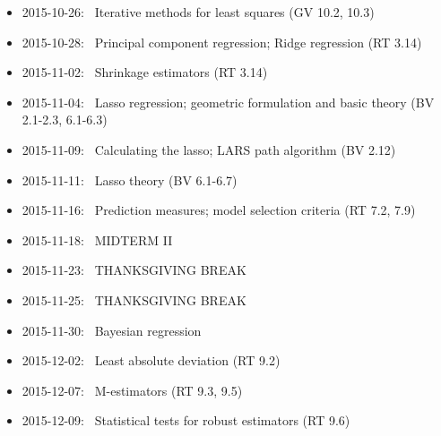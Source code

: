 \documentclass[12pt]{article}
\begin{document}
\begin{itemize}
\item 2015-10-26: \, Iterative methods for least squares (GV 10.2, 10.3)
\item 2015-10-28: \, Principal component regression; Ridge regression (RT 3.14)
\item 2015-11-02: \, Shrinkage estimators (RT 3.14)
\item 2015-11-04: \, Lasso regression; geometric formulation and basic theory (BV 2.1-2.3, 6.1-6.3)
\item 2015-11-09: \, Calculating the lasso; LARS path algorithm (BV 2.12)
\item 2015-11-11: \, Lasso theory (BV 6.1-6.7)
\item 2015-11-16: \, Prediction measures; model selection criteria (RT 7.2, 7.9)
\item 2015-11-18: \, MIDTERM II
\item 2015-11-23: \, THANKSGIVING BREAK
\item 2015-11-25: \, THANKSGIVING BREAK
\item 2015-11-30: \, Bayesian regression
\item 2015-12-02: \, Least absolute deviation (RT 9.2)
\item 2015-12-07: \, M-estimators (RT 9.3, 9.5)
\item 2015-12-09: \, Statistical tests for robust estimators (RT 9.6)
\end{itemize}
\end{document}
